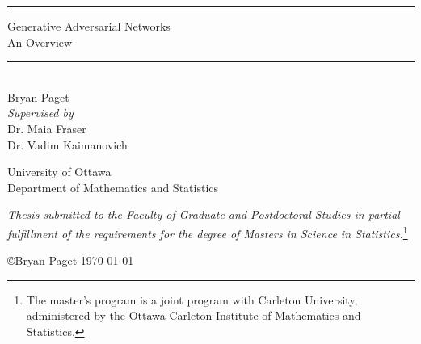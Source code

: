 \begin{titlepage}
  \sffamily
  \setlength{\parindent}{0pt}
  \setlength{\parskip}{0pt}
  \begin{center}
    \rule{\linewidth}{0.05pc}
    \Huge
    Generative Adversarial Networks \\
    \LARGE
    An Overview
    \rule{\linewidth}{0.05pc} \\
    \vspace*{\fill}
    \Huge
    Bryan Paget \\
    \textit{
      \large Supervised by} \\
    \vspace{0.3cm}
    \Large Dr. Maia Fraser \\
    Dr. Vadim Kaimanovich \\

    \vspace{1cm}

    \huge
    University of Ottawa \\
    \normalsize
    Department of Mathematics and Statistics \\

    \vspace*{\fill}

    \small \textit{Thesis submitted to the Faculty of Graduate and Postdoctoral
      Studies in partial \\ fulfillment of the requirements for the degree of
      Masters in Science in Statistics.}\footnote{\sffamily The master's program
      is a joint program with Carleton University, administered by the
      Ottawa-Carleton Institute of Mathematics and Statistics.}

    \vspace*{\fill}

    \small \copyright Bryan Paget \today

  \end{center}
\end{titlepage}

\afterpage{\null\blankpage}

